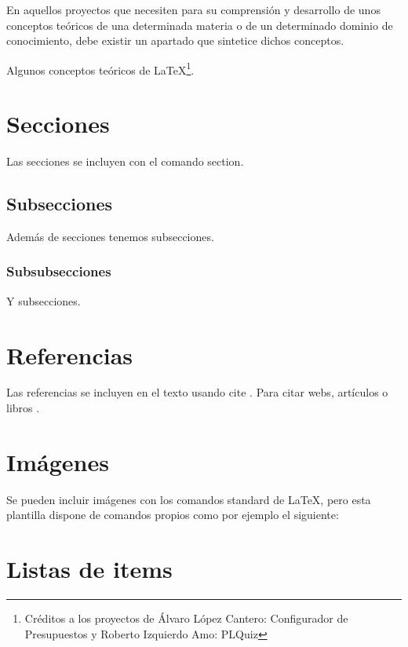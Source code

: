 
En aquellos proyectos que necesiten para su comprensión y desarrollo de unos conceptos teóricos de una determinada materia o de un determinado dominio de conocimiento, debe existir un apartado que sintetice dichos conceptos.

Algunos conceptos teóricos de \LaTeX \footnote{Créditos a los proyectos de Álvaro López Cantero: Configurador de Presupuestos y Roberto Izquierdo Amo: PLQuiz}.	
	
\section{Secciones}

Las secciones se incluyen con el comando section.

\subsection{Subsecciones}

Además de secciones tenemos subsecciones.

\subsubsection{Subsubsecciones}

Y subsecciones. 


\section{Referencias}

Las referencias se incluyen en el texto usando cite \cite{wiki:latex}. Para citar webs, artículos o libros \cite{koza92}.


\section{Imágenes}

Se pueden incluir imágenes con los comandos standard de \LaTeX, pero esta plantilla dispone de comandos propios como por ejemplo el siguiente:




\section{Listas de items}

